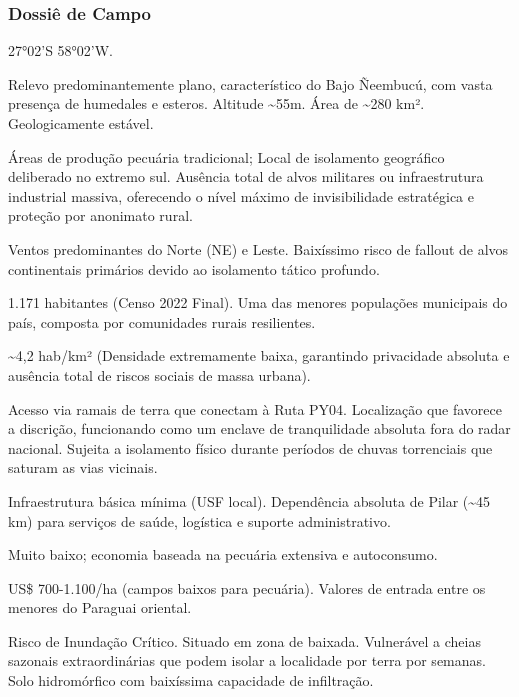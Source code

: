 \subsubsection{Dossiê de Campo}
\begin{description}[style=nextline,leftmargin=0.5cm,font=\bfseries]
\item[Coordenadas]  27°02'S 58°02'W.
\item[Topografia]  Relevo predominantemente plano, característico do Bajo Ñeembucú, com vasta presença de humedales e esteros. Altitude \textasciitilde 55m. Área de \textasciitilde 280 km². Geologicamente estável.
\item[Alvos Estratégicos]  Áreas de produção pecuária tradicional; Local de isolamento geográfico deliberado no extremo sul. Ausência total de alvos militares ou infraestrutura industrial massiva, oferecendo o nível máximo de invisibilidade estratégica e proteção por anonimato rural.
\item[Fallout]  Ventos predominantes do Norte (NE) e Leste. Baixíssimo risco de fallout de alvos continentais primários devido ao isolamento tático profundo.
\item[População]  1.171 habitantes (Censo 2022 Final). Uma das menores populações municipais do país, composta por comunidades rurais resilientes.
\item[Densidade]  \textasciitilde 4,2 hab/\allowbreak km² (Densidade extremamente baixa, garantindo privacidade absoluta e ausência total de riscos sociais de massa urbana).
\item[Vias de Acesso]  Acesso via ramais de terra que conectam à Ruta PY04. Localização que favorece a discrição, funcionando como um enclave de tranquilidade absoluta fora do radar nacional. Sujeita a isolamento físico durante períodos de chuvas torrenciais que saturam as vias vicinais.
\item[Serviços]  Infraestrutura básica mínima (USF local). Dependência absoluta de Pilar (\textasciitilde 45 km) para serviços de saúde, logística e suporte administrativo.
\item[Custo de Vida]  Muito baixo; economia baseada na pecuária extensiva e autoconsumo.
\item[Preço da Terra]  US\$ 700-1.100/\allowbreak ha (campos baixos para pecuária). Valores de entrada entre os menores do Paraguai oriental.
\item[Hidrologia]  Risco de Inundação Crítico. Situado em zona de baixada. Vulnerável a cheias sazonais extraordinárias que podem isolar a localidade por terra por semanas. Solo hidromórfico com baixíssima capacidade de infiltração.

\end{description}
